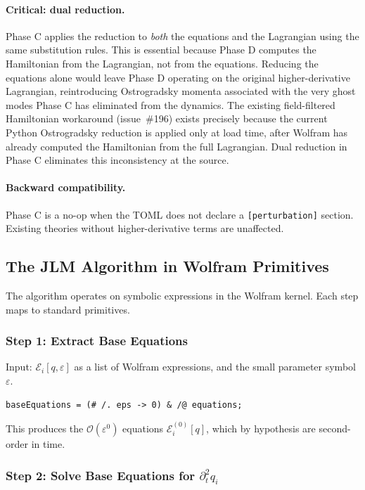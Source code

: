 \paragraph{Critical: dual reduction.} Phase C applies the reduction to \emph{both} the equations and the Lagrangian using the same substitution rules. This is essential because Phase D computes the Hamiltonian from the Lagrangian, not from the equations. Reducing the equations alone would leave Phase D operating on the original higher-derivative Lagrangian, reintroducing Ostrogradsky momenta associated with the very ghost modes Phase C has eliminated from the dynamics. The existing field-filtered Hamiltonian workaround (issue~\#196) exists precisely because the current Python Ostrogradsky reduction is applied only at load time, after Wolfram has already computed the Hamiltonian from the full Lagrangian. Dual reduction in Phase C eliminates this inconsistency at the source.

\paragraph{Backward compatibility.} Phase C is a no-op when the TOML does not declare a \texttt{[perturbation]} section. Existing theories without higher-derivative terms are unaffected.

\subsection{The JLM Algorithm in Wolfram Primitives}
\label{sec:prd-algorithm}

The algorithm operates on symbolic expressions in the Wolfram kernel. Each step maps to standard primitives.

\subsubsection{Step 1: Extract Base Equations}

Input: $\mathcal{E}_i[q, \varepsilon]$ as a list of Wolfram expressions, and the small parameter symbol $\varepsilon$.

\begin{verbatim}
baseEquations = (# /. eps -> 0) & /@ equations;
\end{verbatim}

This produces the $\mathcal{O}(\varepsilon^0)$ equations $\mathcal{E}_i^{(0)}[q]$, which by hypothesis are second-order in time.

\subsubsection{Step 2: Solve Base Equations for $\partial_t^2 q_i$}

